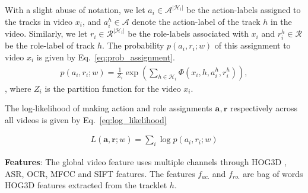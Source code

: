 \documentclass[10pt,twocolumn,letterpaper]{article}
\begin{document}
With a slight abuse of notation, we let $a_i \in \mathcal{A}^{|\mathcal{H}_i|}$ be the action-labels assigned to the tracks in video $x_i$, 
and $a_i^h \in \mathcal{A}$ denote the action-label of the track $h$ in the video. 
Similarly, we let $r_i \in \mathcal{R}^{|\mathcal{H}_i|}$ be the role-labels associated with $x_i$ and $r_i^h \in \mathcal{R}$ be the role-label of track $h$.
The probability $p(a_i, r_i; w)$ of this assignment to video $x_i$ is given by Eq.~\ref{eq:prob_assignment}.
\vspace{-4pt}
\begin{eqnarray}\label{eq:prob_assignment}
  p(a_i, r_i; w) = \frac{1}{Z_i} \exp \left(\sum \limits_{h \in \mathcal{H}_i} \Phi(x_i, h, a_i^h, r_i^h) \right),
\end{eqnarray}, where $Z_i$ is the partition function for the video $x_i$.

The log-likelihood of making action and role assignments $\mathbf{a}, \mathbf{r}$ respectively across all videos is
given by Eq.~\ref{eq:log_likelihood}

\begin{eqnarray}\label{eq:log_likelihood}
  L(\mathbf{a}, \mathbf{r}; w) = \sum \limits_{i} \log p(a_i, r_i; w)
\end{eqnarray}

\noindent \textbf{Features}: The global video feature uses multiple channels through
HOG3D \cite{Klaser_BMVC08}, ASR, OCR, MFCC \cite{Rabiner_PH93} and SIFT
\cite{Lowe_IJCV04} features. The features $f_{ac.}$ and $f_{ro.}$
are bag of words HOG3D features extracted from the tracklet $h$.

\end{document}

